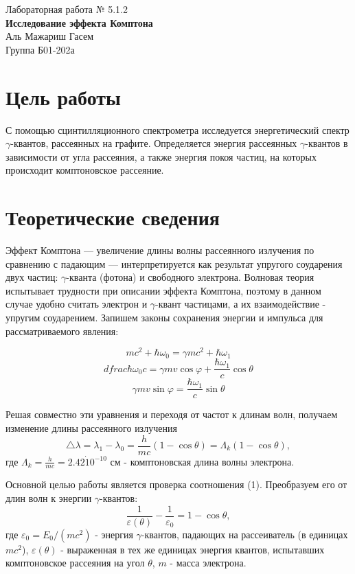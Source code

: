 \documentclass[a4paper,12pt]{article} %
\begin{document}
\begin{center}   
	\large{Лабораторная работа № 5.1.2\\\large{\textbf{Исследование эффекта Комптона}}}\\
		Аль Мажариш Гасем\\
		Группа Б01-202а
\end{center}

\thispagestyle{empty}

\section * {Цель работы}
С помощью сцинтилляционного спектрометра исследуется энергетический спектр $\gamma$-квантов, рассеянных на графите. Определяется энергия рассеянных $\gamma$-квантов в зависимости от угла рассеяния, а также энергия покоя частиц, на которых происходит комптоновское рассеяние.

\section * {Теоретические сведения}

Эффект Комптона — увеличение длины волны рассеянного излучения по сравнению с падающим — интерпретируется как результат упругого соударения двух частиц: $\gamma$-кванта (фотона) и свободного электрона. Волновая теория испытывает трудности при описании эффекта Комптона, поэтому в данном случае удобно считать электрон и $\gamma$-квант частицами, а их взаимодействие - упругим соударением. Запишем законы сохранения энергии и импульса для рассматриваемого явления:

\[ mc^2 + \hbar \omega_0 = \gamma mc^2 + \hbar \omega_1 \]
\[ dfrac{\hbar \omega_0}{c} = \gamma mv \cos{\varphi} + \dfrac{\hbar \omega_1}{c} \cos{\theta} \]
\[ \gamma mv \sin{\varphi} = \dfrac{\hbar \omega_1}{c} \sin{\theta} \]

Решая совместно эти уравнения и переходя от частот к длинам волн, получаем изменение длины рассеянного излучения
\begin{equation}
    \triangle \lambda = \lambda_1 - \lambda_0 = \frac{h}{mc}(1 - \cos \theta) = \Lambda_k(1 - \cos \theta),
\end{equation}
где $\Lambda_k = \frac{h}{mc} = 2.42 \dot 10^{-10}$ см - комптоновская длина волны электрона. \par
Основной целью работы является проверка соотношения (1). Преобразуем его от длин волн к энергии $\gamma$-квантов:
\begin{equation}
    \frac{1}{\varepsilon(\theta)} - \frac{1}{\varepsilon_0} = 1 - \cos \theta,
    \label{eq:Комптон_нормир}
\end{equation}
где $\varepsilon_0 = E_0/(mc^2)$ - энергия $\gamma$-квантов, падающих на рассеиватель (в единицах $mc^2$), $\varepsilon(\theta)$ - выраженная в тех же единицах энергия квантов, испытавших комптоновское рассеяния на угол $\theta$, $m$ - масса электрона.
\end{document}
